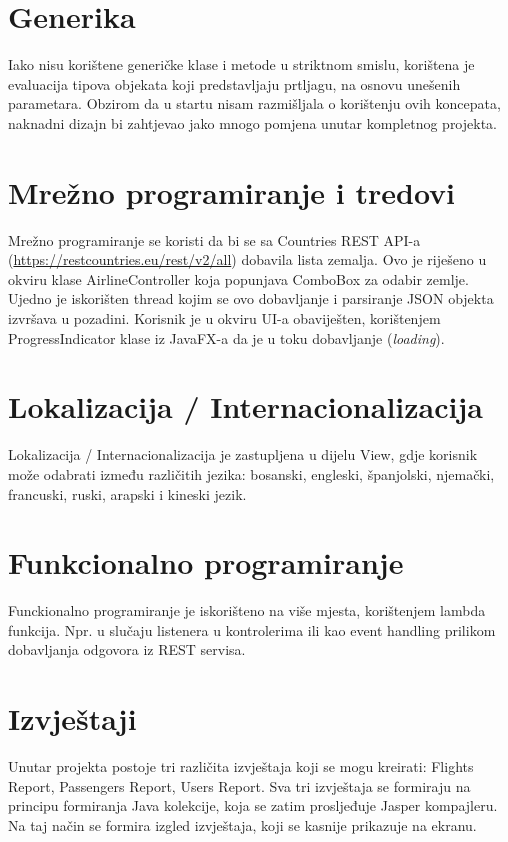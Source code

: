 \section{Generika}

Iako nisu korištene generičke klase i metode u striktnom smislu, korištena je evaluacija tipova objekata koji predstavljaju prtljagu, na osnovu unešenih parametara. Obzirom da u startu nisam razmišljala o korištenju ovih koncepata, naknadni dizajn bi zahtjevao jako mnogo pomjena unutar kompletnog projekta.

\section{Mrežno programiranje i tredovi}

Mrežno programiranje se koristi da bi se sa Countries REST API-a (\url{https://restcountries.eu/rest/v2/all}) dobavila lista zemalja. Ovo je riješeno u okviru klase AirlineController koja popunjava ComboBox za odabir zemlje. Ujedno je iskorišten thread kojim se ovo dobavljanje i parsiranje JSON objekta izvršava u pozadini. Korisnik je u okviru UI-a obaviješten, korištenjem ProgressIndicator klase iz JavaFX-a da je u toku dobavljanje (\textit{loading}).

\section{Lokalizacija / Internacionalizacija}

Lokalizacija / Internacionalizacija je zastupljena u dijelu View, gdje korisnik može odabrati između različitih jezika: bosanski, engleski, španjolski, njemački, francuski, ruski, arapski i kineski jezik.

\section{Funkcionalno programiranje}

Funckionalno programiranje je iskorišteno na više mjesta, korištenjem lambda funkcija. Npr. u slučaju listenera u kontrolerima ili kao event handling prilikom dobavljanja odgovora iz REST servisa.

\section{Izvještaji}

Unutar projekta postoje tri različita izvještaja koji se mogu kreirati: Flights Report, Passengers Report, Users Report. Sva tri izvještaja se formiraju na principu formiranja Java kolekcije, koja se zatim prosljeđuje Jasper kompajleru. Na taj način se formira izgled izvještaja, koji se kasnije prikazuje na ekranu.

